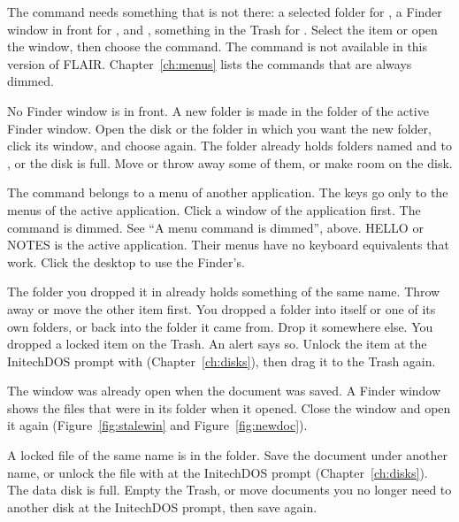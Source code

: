 \Cause The command needs something that is not there: a selected folder
for , a Finder window in front for ,
 and , something in the
Trash for .
\Solution Select the item or open the window, then choose the command.
\Cause The command is not available in this version of FLAIR.
\Solution Chapter~\ref{ch:menus} lists the commands that are always dimmed.

\Cause No Finder window is in front.  A new folder is made in the folder of
the active Finder window.
\Solution Open the disk or the folder in which you want the new folder,
click its window, and choose  again.
\Cause The folder already holds folders named  and
 to , or the disk is full.
\Solution Move or throw away some of them, or make room on the disk.

\Cause The command belongs to a menu of another application.  The keys go
only to the menus of the active application.
\Solution Click a window of the application first.
\Cause The command is dimmed.
\Solution See ``A menu command is dimmed'', above.
\Cause HELLO or NOTES is the active application.
\Solution Their menus have no keyboard equivalents that work.  Click the
desktop to use the Finder's.

\Cause The folder you dropped it in already holds something of the same
name.
\Solution Throw away or move the other item first.
\Cause You dropped a folder into itself or one of its own folders, or back
into the folder it came from.
\Solution Drop it somewhere else.
\Cause You dropped a locked item on the Trash.
\Solution An alert says so.  Unlock the item at the InitechDOS prompt with
 (Chapter~\ref{ch:disks}), then drag it to the Trash again.

\Cause The window was already open when the document was saved.  A Finder
window shows the files that were in its folder when it opened.
\Solution Close the window and open it again (Figure~\ref{fig:stalewin}
and Figure~\ref{fig:newdoc}).

\Cause A locked file of the same name is in the folder.
\Solution Save the document under another name, or unlock the file with
 at the InitechDOS prompt (Chapter~\ref{ch:disks}).
\Cause The data disk is full.
\Solution Empty the Trash, or move documents you no longer need to another
disk at the InitechDOS prompt, then save again.

